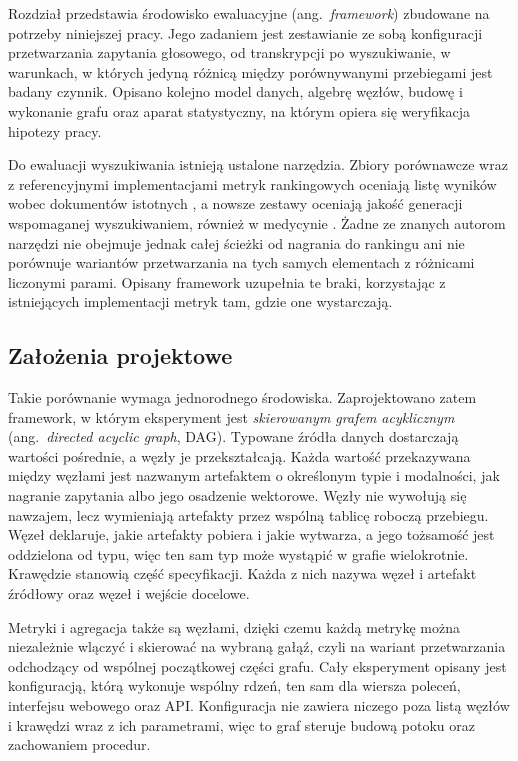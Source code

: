 Rozdział przedstawia środowisko ewaluacyjne (ang.\ \textit{framework}) zbudowane na potrzeby
niniejszej pracy. Jego zadaniem jest zestawianie ze sobą konfiguracji przetwarzania zapytania
głosowego, od transkrypcji po wyszukiwanie, w warunkach, w których jedyną różnicą między
porównywanymi przebiegami jest badany czynnik. Opisano kolejno model danych, algebrę węzłów,
budowę i wykonanie grafu oraz aparat statystyczny, na którym opiera się weryfikacja hipotezy
pracy.

Do ewaluacji wyszukiwania istnieją ustalone narzędzia. Zbiory porównawcze wraz z referencyjnymi
implementacjami metryk rankingowych oceniają listę wyników wobec dokumentów istotnych
\cite{manning2008introduction, lin2020}, a nowsze zestawy oceniają jakość generacji wspomaganej
wyszukiwaniem, również w medycynie \cite{pubmed, thakur2021beir, es2024ragas}. Żadne ze znanych
autorom narzędzi nie obejmuje jednak całej ścieżki od nagrania do rankingu ani nie porównuje
wariantów przetwarzania na tych samych elementach z różnicami liczonymi parami. Opisany framework
uzupełnia te braki, korzystając z istniejących implementacji metryk tam, gdzie one wystarczają.

\subsection{Założenia projektowe}
Takie porównanie wymaga jednorodnego środowiska. Zaprojektowano zatem framework, w którym
eksperyment jest \textit{skierowanym grafem acyklicznym} (ang.\ \textit{directed acyclic graph},
DAG). Typowane źródła danych dostarczają wartości pośrednie, a węzły je przekształcają. Każda
wartość przekazywana między węzłami jest nazwanym artefaktem o określonym typie i modalności, jak
nagranie zapytania albo jego osadzenie wektorowe. Węzły nie wywołują się nawzajem, lecz wymieniają
artefakty przez wspólną tablicę roboczą przebiegu. Węzeł deklaruje, jakie artefakty pobiera i
jakie wytwarza, a jego tożsamość jest oddzielona od typu, więc ten sam typ może wystąpić w grafie
wielokrotnie. Krawędzie stanowią część specyfikacji. 
Każda z nich nazywa węzeł i artefakt źródłowy oraz węzeł i wejście docelowe.

Metryki i agregacja także są węzłami, dzięki czemu każdą metrykę można niezależnie wlączyć i
skierować na wybraną gałąź, czyli na wariant przetwarzania odchodzący od wspólnej początkowej
części grafu. Cały eksperyment opisany jest konfiguracją, którą wykonuje wspólny rdzeń, ten sam
dla wiersza poleceń, interfejsu webowego oraz API. Konfiguracja nie
zawiera niczego poza listą węzłów i krawędzi wraz z ich parametrami, więc to graf steruje budową
potoku oraz zachowaniem procedur.

